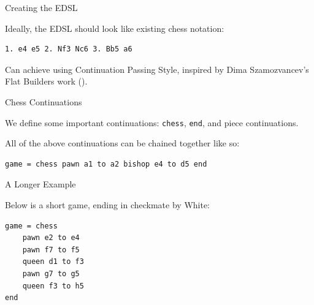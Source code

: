 \documentclass{beamer}
\newcommand{\inline}[1]{\lstinline[basicstyle=\ttfamily]{#1}}
\begin{document}




\begin{frame}[fragile]{Creating the EDSL}

Ideally, the EDSL should look like existing chess notation:

\begin{verbatim}
1. e4 e5 2. Nf3 Nc6 3. Bb5 a6
\end{verbatim}


Can achieve using Continuation Passing Style, inspired by Dima Szamozvancev's Flat Builders work (\cite{mezzo}).

\end{frame}

\begin{frame}[fragile]{Chess Continuations}

We define some important continuations: \pause \inline{chess}, \pause \inline{end}, \pause and piece continuations.


\pause

All of the above continuations can be chained together like so:

\begin{lstlisting}
game = chess pawn a1 to a2 bishop e4 to d5 end
\end{lstlisting}

\end{frame}

\begin{frame}[fragile]{A Longer Example}

Below is a short game, ending in checkmate by White:

\begin{figure}[h]
    \centering
    \newgame
    \scalebox{0.55}{\showboard}
    \quad
    \scalebox{0.55}{\showboard}
    \label{threemovecheckmate}
\end{figure}

\pause

\begin{lstlisting}
game = chess
    pawn e2 to e4
    pawn f7 to f5
    queen d1 to f3
    pawn g7 to g5
    queen f3 to h5
end
\end{lstlisting}

\end{frame}
\end{document}
